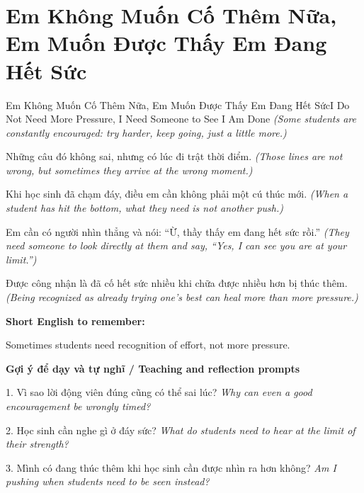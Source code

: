 \section{Em Không Muốn Cố Thêm Nữa, Em Muốn Được Thấy Em Đang Hết Sức}
\begin{truyen}{Em Không Muốn Cố Thêm Nữa, Em Muốn Được Thấy Em Đang Hết Sức}{I Do Not Need More Pressure, I Need Someone to See I Am Done}
\textit{(Some students are constantly encouraged: try harder, keep going, just a little more.)}

Những câu đó không sai, nhưng có lúc đi trật thời điểm.
\textit{(Those lines are not wrong, but sometimes they arrive at the wrong moment.)}

Khi học sinh đã chạm đáy, điều em cần không phải một cú thúc mới.
\textit{(When a student has hit the bottom, what they need is not another push.)}

Em cần có người nhìn thẳng và nói: “Ừ, thầy thấy em đang hết sức rồi.”
\textit{(They need someone to look directly at them and say, “Yes, I can see you are at your limit.”)}

\end{truyen}

\begin{baihoc}
Được công nhận là đã cố hết sức nhiều khi chữa được nhiều hơn bị thúc thêm.
\textit{(Being recognized as already trying one's best can heal more than more pressure.)}
\end{baihoc}

\begin{ghinhoanh}
\textbf{Short English to remember:}

Sometimes students need recognition of effort, not more pressure.

\end{ghinhoanh}

\begin{tuhocnhanh}
\textbf{Gợi ý để dạy và tự nghĩ / Teaching and reflection prompts}

1. Vì sao lời động viên đúng cũng có thể sai lúc? \textit{Why can even a good encouragement be wrongly timed?}

2. Học sinh cần nghe gì ở đáy sức? \textit{What do students need to hear at the limit of their strength?}

3. Mình có đang thúc thêm khi học sinh cần được nhìn ra hơn không? \textit{Am I pushing when students need to be seen instead?}
\end{tuhocnhanh}
\ngancach

